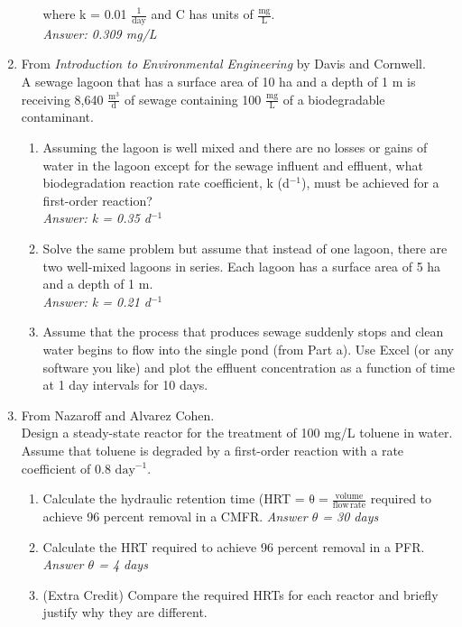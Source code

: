\documentclass[12pt,letterpaper]{article}
\begin{document}
\begin{enumerate}
\begin{enumerate}
where k = 0.01 $\mathrm{\frac{1}{day}}$ and C has units of $\mathrm{\frac{mg}{L}}$.\\
\emph{Answer: 0.309 mg/L}
\end{enumerate}

\item From \emph{Introduction to Environmental Engineering} by Davis and Cornwell.\\
A sewage lagoon that has a surface area of 10 ha and a depth of 1 m is receiving 8,640 $\mathrm{\frac{m^3}{d}}$ of sewage containing 100 $\mathrm{\frac{mg}{L}}$ of a biodegradable contaminant.  
\begin{enumerate}
\item Assuming the lagoon is well mixed and there are no losses or gains of water in the lagoon except for the sewage influent and effluent, what biodegradation reaction rate coefficient, k (d$^{-1}$), must be achieved for a first-order reaction?\\
\emph{Answer: k = 0.35 d$^{-1}$}

\item Solve the same problem but assume that instead of one lagoon, there are two well-mixed lagoons in series.  Each lagoon has a surface area of 5 ha and a depth of 1 m.\\
\emph{Answer: k = 0.21 d$^{-1}$}

\item Assume that the process that produces sewage suddenly stops and clean water begins to flow into the single pond (from Part a).  Use Excel (or any software you like) and plot the effluent concentration as a function of time at 1 day intervals for 10 days. 
 
\end{enumerate}
\item From Nazaroff and Alvarez Cohen.\\
Design a steady-state reactor for the treatment of 100 mg/L toluene in water.  Assume that toluene is degraded by a first-order reaction with a rate coefficient of 0.8 $\mathrm{day^{-1}}$.
\begin{enumerate}
\item Calculate the hydraulic retention time (HRT = $\mathrm{\theta = \frac{volume}{flow\, rate}}$ required to achieve 96 percent removal in a CMFR. \emph{Answer $\theta$ = 30 days}
\item Calculate the HRT required to achieve 96 percent removal in a PFR. \emph{Answer $\theta$ = 4 days}
\item (Extra Credit) Compare the required HRTs for each reactor and briefly justify why they are different.
\end{enumerate}
\end{enumerate}
\end{document}
